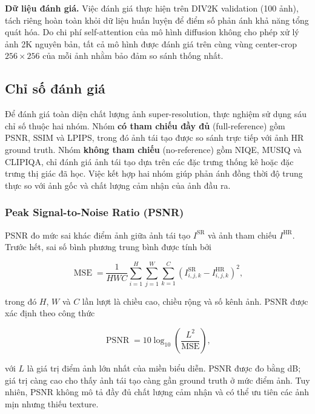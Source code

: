 \textbf{Dữ liệu đánh giá.} Việc đánh giá thực hiện trên DIV2K validation (100
ảnh), tách riêng hoàn toàn khỏi dữ liệu huấn luyện để điểm số phản ánh khả năng
tổng quát hóa. Do chi phí self-attention của mô hình diffusion không cho phép xử
lý ảnh 2K nguyên bản, tất cả mô hình được đánh giá trên cùng vùng center-crop
$256 \times 256$ của mỗi ảnh nhằm bảo đảm so sánh thống nhất.

\subsection{Chỉ số đánh giá}
\label{sec:evaluation-metrics}

Để đánh giá toàn diện chất lượng ảnh super-resolution, thực nghiệm sử dụng sáu
chỉ số thuộc hai nhóm. Nhóm \textbf{có tham chiếu đầy đủ} (full-reference) gồm
PSNR, SSIM và LPIPS, trong đó ảnh tái tạo được so sánh trực tiếp với ảnh HR
ground truth. Nhóm \textbf{không tham chiếu} (no-reference) gồm NIQE, MUSIQ và
CLIPIQA, chỉ đánh giá ảnh tái tạo dựa trên các đặc trưng thống kê hoặc đặc trưng
thị giác đã học. Việc kết hợp hai nhóm giúp phản ánh đồng thời độ trung thực so
với ảnh gốc và chất lượng cảm nhận của ảnh đầu ra.

\subsubsection{Peak Signal-to-Noise Ratio (PSNR)}

PSNR đo mức sai khác điểm ảnh giữa ảnh tái tạo $I^{\mathrm{SR}}$ và ảnh tham
chiếu $I^{\mathrm{HR}}$. Trước hết, sai số bình phương trung bình được tính bởi

\begin{equation}
\operatorname{MSE}
=\frac{1}{HWC}
\sum_{i=1}^{H}\sum_{j=1}^{W}\sum_{k=1}^{C}
\left(I^{\mathrm{SR}}_{i,j,k}-I^{\mathrm{HR}}_{i,j,k}\right)^2,
\end{equation}

trong đó $H$, $W$ và $C$ lần lượt là chiều cao, chiều rộng và số kênh ảnh. PSNR
được xác định theo công thức

\begin{equation}
\operatorname{PSNR}
=10\log_{10}\left(\frac{L^2}{\operatorname{MSE}}\right),
\end{equation}

với $L$ là giá trị điểm ảnh lớn nhất của miền biểu diễn. PSNR được đo bằng dB;
giá trị càng cao cho thấy ảnh tái tạo càng gần ground truth ở mức điểm ảnh. Tuy
nhiên, PSNR không mô tả đầy đủ chất lượng cảm nhận và có thể ưu tiên các ảnh mịn
nhưng thiếu texture.


